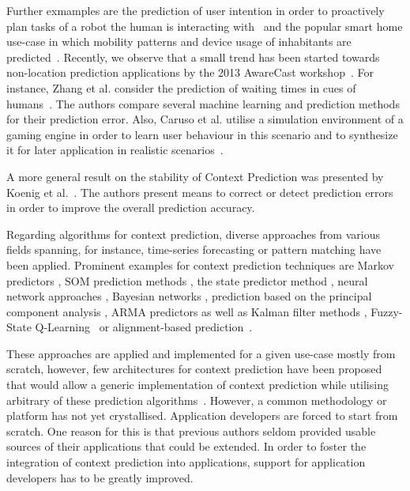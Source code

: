 Further exmamples are the prediction of user intention in order to proactively plan tasks of a robot the human is interacting with~\cite{5830} and the popular smart home use-case in which mobility patterns and device usage of inhabitants are predicted~\cite{5163,Prediction_Tenorth_2009}.
Recently, we observe that a small trend has been started towards non-location prediction applications by the 2013 AwareCast workshop~\cite{Prediction_2013_David}.
For instance, Zhang et al. consider the prediction of waiting times in cues of humans~\cite{Prediction_Zhang_2013}. 
The authors compare several machine learning and prediction methods for their prediction error.
Also, Caruso et al. utilise a simulation environment of a gaming engine in order to learn user behaviour in this scenario and to synthesize it for later application in realistic scenarios~\cite{Prediction_Caruso_2013}.

A more general result on the stability of Context Prediction was presented by Koenig et al.~\cite{Prediction_Koenig_2013}.
The authors present means to correct or detect prediction errors in order to improve the overall prediction accuracy.

Regarding algorithms for context prediction, diverse approaches from various fields spanning, for instance, time-series forecasting or pattern matching have been applied. 
Prominent examples for context prediction techniques are Markov predictors \cite{6013}, SOM prediction methods \cite{6016,5001}, the state predictor method \cite{5027,5001}, neural network approaches \cite{5027,2026}, Bayesian networks \cite{5027}, prediction based on the principal component analysis \cite{2097}, ARMA predictors \cite{5001} as well as Kalman filter methods \cite{2040}, Fuzzy-State Q-Learning~\cite{ContextPrediction_Feki_2007} or alignment-based prediction~\cite{4026}.

These approaches are applied and implemented for a given use-case mostly from scratch, however, few architectures for context prediction have been proposed that would allow a generic implementation of context prediction while utilising arbitrary of these prediction algorithms~\cite{4011,5001,5010}.
However, a common methodology or platform has not yet crystallised. 
Application developers are forced to start from scratch. 
One reason for this is that previous authors seldom provided usable sources of their applications that could be extended. 
In order to foster the integration of context prediction into applications, support for application developers has to be greatly improved. 


